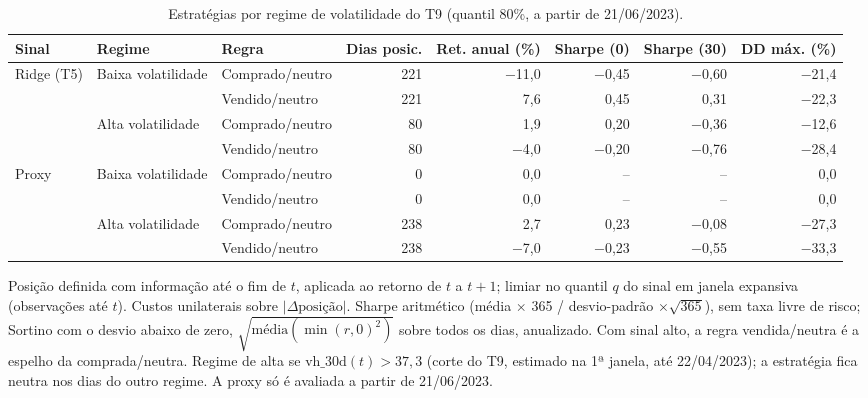 \begin{table}[H]
\centering
\small
\caption{Estratégias por regime de volatilidade do T9 (quantil 80\%, a partir de 21/06/2023).}
\label{tab:A1-regimes}
\begin{tabular}{lllrrrrr}
\toprule
Sinal & Regime & Regra & Dias posic. & Ret. anual (\%) & Sharpe (0) & Sharpe (30) & DD máx. (\%) \\
\midrule
Ridge (T5) & Baixa volatilidade & Comprado/neutro & 221 & $-$11{,}0 & $-$0{,}45 & $-$0{,}60 & $-$21{,}4 \\
 &  & Vendido/neutro & 221 & 7{,}6 & 0{,}45 & 0{,}31 & $-$22{,}3 \\
 & Alta volatilidade & Comprado/neutro & 80 & 1{,}9 & 0{,}20 & $-$0{,}36 & $-$12{,}6 \\
 &  & Vendido/neutro & 80 & $-$4{,}0 & $-$0{,}20 & $-$0{,}76 & $-$28{,}4 \\
\midrule
Proxy & Baixa volatilidade & Comprado/neutro & 0 & 0{,}0 & -- & -- & 0{,}0 \\
 &  & Vendido/neutro & 0 & 0{,}0 & -- & -- & 0{,}0 \\
 & Alta volatilidade & Comprado/neutro & 238 & 2{,}7 & 0{,}23 & $-$0{,}08 & $-$27{,}3 \\
 &  & Vendido/neutro & 238 & $-$7{,}0 & $-$0{,}23 & $-$0{,}55 & $-$33{,}3 \\
\bottomrule
\end{tabular}

\par\smallskip\parbox{\linewidth}{\footnotesize Posição definida com informação até o fim de $t$, aplicada ao retorno de $t$ a $t+1$; limiar no quantil $q$ do sinal em janela expansiva (observações até $t$). Custos unilaterais sobre $|\Delta \text{posição}|$. Sharpe aritmético (média $\times$ 365 / desvio-padrão $\times \sqrt{365}$), sem taxa livre de risco; Sortino com o desvio abaixo de zero, $\sqrt{\text{média}(\min(r, 0)^2)}$ sobre todos os dias, anualizado. Com sinal alto, a regra vendida/neutra é a espelho da comprada/neutra. Regime de alta se $\text{vh\_30d}(t) > 37{,}3$ (corte do T9, estimado na 1ª janela, até 22/04/2023); a estratégia fica neutra nos dias do outro regime. A proxy só é avaliada a partir de 21/06/2023.}
\end{table}
